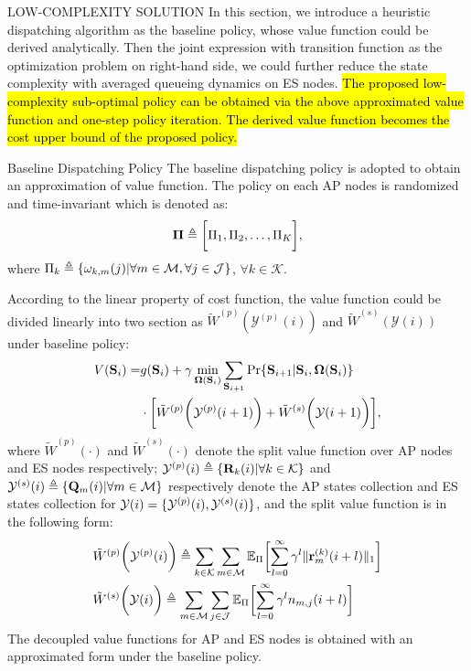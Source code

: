 \documentclass[10pt, conference, letterpaper]{IEEEtran}
\newcommand{\mat}{\mathbf}
\newcommand{\define}{\triangleq}
\renewcommand{\vec}{\mathbf}
\DeclarePairedDelimiter{\set}{\{}{\}}
\DeclarePairedDelimiter{\Inorm}{\|}{\|_1}
\DeclarePairedDelimiter{\Paren}{\bigg(}{\bigg)}
\DeclarePairedDelimiter{\Bracket}{\bigg[}{\bigg]}
\newcommand{\apSet}{\mathcal{K}}
\newcommand{\esSet}{\mathcal{M}}
\newcommand{\jSpace}{\mathcal{J}}
\newcommand{\Stat}{\mathbf{S}}
\newcommand{\Obsv}{\mathcal{Y}}
\newcommand{\Policy}{\mathbf{\Omega}}
\begin{document}
    \begin{section}{LOW-COMPLEXITY SOLUTION}
        \label{sec:algorithm}
        In this section, we introduce a heuristic dispatching algorithm as the baseline policy, whose value function could be derived analytically. Then the joint expression with transition function as the optimization problem on right-hand side, we could further reduce the state complexity with averaged queueing dynamics on ES nodes.
        \hl{The proposed low-complexity sub-optimal policy can be obtained via the above approximated value function and one-step policy iteration. The derived value function becomes the cost upper bound of the proposed policy.}

        \begin{subsection}{Baseline Dispatching Policy}
            The baseline dispatching policy is adopted to obtain an approximation of value function. The policy on each AP nodes is randomized and time-invariant which is denoted as:
            \begin{align}
                \vec{\Pi} \define \Bracket{\Pi_1, \Pi_2, \dots, \Pi_K},
            \end{align}
            where $\Pi_k \define \set{\omega_{k,m}(j)|\forall m\in\esSet,\forall j\in\jSpace}$, $\forall k\in\apSet$.

            According to the linear property of cost function, the value function could be divided linearly into two section as $\tilde{W}^{(p)}(\Obsv^{(p)}(i))$ and $\tilde{W}^{(s)}(\Obsv(i))$ under baseline policy:
            \begin{align}
                V(\Stat_{i}) =& 
                    g(\Stat_{i}) + \gamma \min_{\Policy(\Stat_{i})} \sum_{\Stat_{i+1}} \Pr\{ \Stat_{i+1}|\Stat_{i}, \Policy(\Stat_{i}) \}
                    \nonumber\\
                    & \cdot \Bracket{ \tilde{W}^{(p)}\Paren{\Obsv^{(p)}(i+1)} + \tilde{W}^{(s)}\Paren{\Obsv(i+1)} },
            \end{align}
            where $\tilde{W}^{(p)}(\cdot)$ and $\tilde{W}^{(s)}(\cdot)$ denote the split value function over AP nodes and ES nodes respectively; $\Obsv^{(p)}(i) \define \set{\mat{R}_k(i)|\forall k\in\apSet}$ and $\Obsv^{(s)}(i) \define \set{\vec{Q}_m(i)|\forall m\in\esSet}$ respectively denote the AP states collection and ES states collection for $\Obsv(i) = \set{\Obsv^{(p)}(i), \Obsv^{(s)}(i)}$, and the split value function is in the following form:
            \begin{align}
                &\tilde{W}^{(p)}\Paren{\Obsv^{(p)}(i)} \define \sum_{k\in\apSet}\sum_{m\in\esSet}
                    \mathbb{E}_{\Pi}\Bracket{\sum_{l=0}^{\infty} \gamma^{l} \Inorm{\vec{r}^{(k)}_{m}(i+l)}}
                \\
                &\tilde{W}^{(s)}\Paren{\Obsv(i)} \define \sum_{m\in\esSet} \sum_{j\in\jSpace}
                    \mathbb{E}_{\Pi}\Bracket{\sum_{l=0}^{\infty} \gamma^{l} n_{m,j}(i+l)}
            \end{align}
            The decoupled value functions for AP and ES nodes is obtained with an approximated form under the baseline policy.


\end{subsection}
\end{section}
\end{document}
